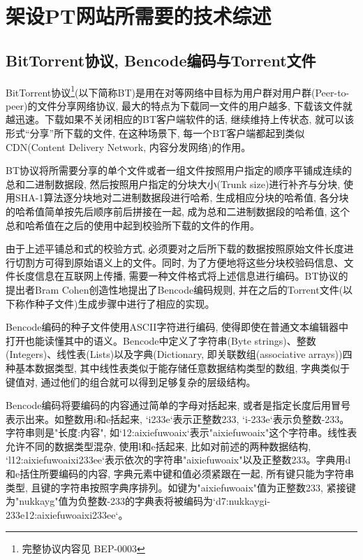 \chapter{架设PT网站所需要的技术综述}

\section{BitTorrent协议, Bencode编码与Torrent文件}
\label{sec:BitorrentProtocol}

BitTorrent协议\footnote{完整协议内容见 BEP-0003\cite{bramcohen2008bep0003}}(以下简称BT)是用在对等网络中目标为用户群对用户群(Peer-to-peer)的文件分享网络协议, 最大的特点为下载同一文件的用户越多, 下载该文件就越迅速。下载如果不关闭相应的BT客户端软件的话, 继续维持上传状态, 就可以该形式``分享''所下载的文件, 在这种场景下, 每一个BT客户端都起到类似CDN(Content Delivery Network, 内容分发网络)的作用。

BT协议将所需要分享的单个文件或者一组文件按照用户指定的顺序平铺成连续的总和二进制数据段, 然后按照用户指定的分块大小(Trunk size)进行补齐与分块, 使用SHA-1算法逐分块地对二进制数据段进行哈希, 生成相应分块的哈希值, 各分块的哈希值简单按先后顺序前后拼接在一起, 成为总和二进制数据段的哈希值, 这个总和哈希值在之后的使用中起到校验所下载的文件的作用。

由于上述平铺总和式的校验方式, 必须要对之后所下载的数据按照原始文件长度进行切割方可得到原始语义上的文件。同时, 为了方便地将这些分块校验码信息、文件长度信息在互联网上传播, 需要一种文件格式将上述信息进行编码。BT协议的提出者Bram Cohen创造性地提出了Bencode编码规则, 并在之后的Torrent文件(以下称作种子文件)生成步骤中进行了相应的实现。

Bencode编码的种子文件使用ASCII字符进行编码, 使得即使在普通文本编辑器中打开也能读懂其中的语义。Bencode中定义了字符串(Byte strings)、整数(Integers)、线性表(Lists)以及字典(Dictionary, 即关联数组(associative arrays))四种基本数据类型, 其中线性表类似于能存储任意数据结构类型的数组, 字典类似于键值对, 通过他们的组合就可以得到足够复杂的层级结构。

Bencode编码将要编码的内容通过简单的字母对括起来, 或者是指定长度后用冒号表示出来。如整数用i和e括起来, `i233e`表示正整数233, `i-233e`表示负整数-233。字符串则是"长度:内容", 如`12:aixiefuwoaix`表示"aixiefuwoaix"这个字符串。线性表允许不同的数据类型混杂, 使用l和e括起来, 比如对前述的两种数据结构, `l12:aixiefuwoaixi\-233ee`表示依次的字符串"aixiefuwoaix"以及正整数233。字典用d和e括住所要编码的内容, 字典元素中键和值必须紧跟在一起, 所有键只能为字符串类型, 且键的字符串按照字典序排列。如键为"aixiefuwoaix"值为正整数233, 紧接键为"nukkayg"值为负整数-233的字典表将被编码为`d7:nukkaygi-233e12:aixiefuwoaixi233ee`。

